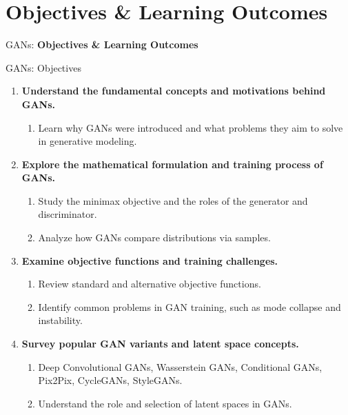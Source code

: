 \section{Objectives \& Learning Outcomes}
\begin{frame}{}
    \LARGE GANs: \textbf{Objectives \& Learning Outcomes}
\end{frame}

\begin{frame}[allowframebreaks]{GANs: Objectives}
    \begin{enumerate}
        \setlength{\itemsep}{-0.1em}
        \item \textbf{Understand the fundamental concepts and motivations behind GANs.}
        \begin{enumerate}
            \setlength{\itemsep}{-0.75em}
            \item Learn why GANs were introduced and what problems they aim to solve in generative modeling.
        \end{enumerate}
        \item \textbf{Explore the mathematical formulation and training process of GANs.}
        \begin{enumerate}
            \setlength{\itemsep}{-0.75em}
            \item Study the minimax objective and the roles of the generator and discriminator.
            \item Analyze how GANs compare distributions via samples.
        \end{enumerate}
        \item \textbf{Examine objective functions and training challenges.}
        \begin{enumerate}
            \setlength{\itemsep}{-0.75em}
            \item Review standard and alternative objective functions.
            \item Identify common problems in GAN training, such as mode collapse and instability.
        \end{enumerate}
        \item \textbf{Survey popular GAN variants and latent space concepts.}
        \begin{enumerate}
            \setlength{\itemsep}{-0.75em}
            \item Deep Convolutional GANs, Wasserstein GANs, Conditional GANs, Pix2Pix, CycleGANs, StyleGANs.
            \item Understand the role and selection of latent spaces in GANs.
        \end{enumerate}
    \end{enumerate}
\end{frame}

